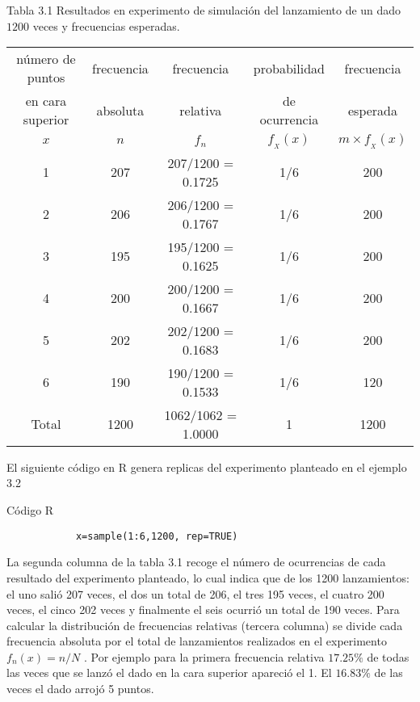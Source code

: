 \documentclass[base=hide,12pt]{elegantbook}
\begin{document}
	\begin{center}
		Tabla 3.1 Resultados en experimento de simulación del lanzamiento de un dado $1200$ veces  y frecuencias esperadas.\\
		{\footnotesize 
		\begin{tabular}{ccccc}
			\hline
			número de puntos & frecuencia  & frecuencia  & probabilidad  & frecuencia \\ 
			en cara superior & absoluta	   & relativa    & de ocurrencia & esperada	  \\	
			$x$ & $n$ & $f_{n}$ & $f_{_{X}}(x)$ & $m \times f_{_{X}}(x)$ \\
			\hline 
			1     & 207   & 207/1200 = 0.1725  & 1/6 & 200 \\ %
			2     & 206   & 206/1200 = 0.1767  & 1/6 & 200 \\ %
			3     & 195   & 195/1200 = 0.1625  & 1/6 & 200 \\ %
			4     & 200   & 200/1200 = 0.1667  & 1/6 & 200 \\ %
			5     & 202   & 202/1200 = 0.1683  & 1/6 & 200 \\ %
			6     & 190   & 190/1200 = 0.1533  & 1/6 & 120 \\ %
			Total & 1200  & 1062/1062 = 1.0000 & 1   & 1200 \\ \hline
		\end{tabular}
	}
	\end{center}
	

El siguiente código en R genera replicas del experimento planteado en el ejemplo 3.2\\

\begin{Box3}{Código R}
	{\small
		\begin{verbatim}
			x=sample(1:6,1200, rep=TRUE)
		\end{verbatim}
	}
\end{Box3}

La segunda columna  de la tabla 3.1 recoge el número de ocurrencias de cada resultado del experimento planteado, lo cual indica que de los 1200 lanzamientos: el uno salió 207 veces, el dos un total de 206, el tres 195 veces, el cuatro 200 veces, el cinco 202 veces y finalmente el seis ocurrió un total de 190 veces. Para calcular  la distribución de frecuencias relativas (tercera columna) se divide cada frecuencia absoluta por el total de lanzamientos realizados en el experimento $f_{n}(x)=n/N$ . Por ejemplo  para la primera frecuencia relativa  $17.25\%$ de todas las veces que se lanzó el dado en la cara superior apareció el 1. El $16.83\%$ de las veces el dado arrojó 5 puntos. \\
\end{document}
